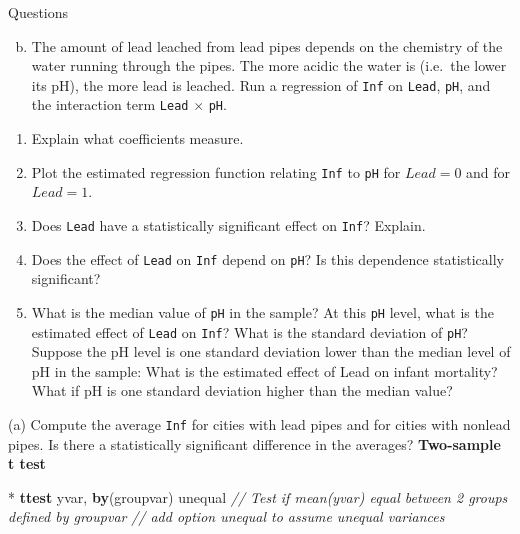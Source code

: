 \documentclass[
  10pt,
  ignorenonframetext,
]{beamer}
\newenvironment{Shaded}{\begin{snugshade}}{\end{snugshade}}
\newcommand{\CommentTok}[1]{\textcolor[rgb]{0.56,0.35,0.01}{\textit{#1}}}
\newcommand{\KeywordTok}[1]{\textcolor[rgb]{0.13,0.29,0.53}{\textbf{#1}}}
\newcommand{\NormalTok}[1]{#1}
\providecommand{\tightlist}{%
  \setlength{\itemsep}{0pt}\setlength{\parskip}{0pt}}
\begin{document}
\begin{frame}[fragile]{Questions}
\protect\hypertarget{questions-3}{}
\begin{enumerate}
[(a)]
\setcounter{enumi}{1}
\tightlist
\item
  The amount of lead leached from lead pipes depends on the chemistry of
  the water running through the pipes. The more acidic the water is
  (i.e.~the lower its pH), the more lead is leached. Run a regression of
  \texttt{Inf} on \texttt{Lead}, \texttt{pH}, and the interaction term
  \texttt{Lead} \(\times\) \texttt{pH}. \small
\end{enumerate}

\begin{enumerate}
\item
  Explain what coefficients measure.
\item
  Plot the estimated regression function relating \texttt{Inf} to
  \texttt{pH} for \(Lead = 0\) and for \(Lead = 1\).
\item
  Does \texttt{Lead} have a statistically significant effect on
  \texttt{Inf}? Explain.
\item
  Does the effect of \texttt{Lead} on \texttt{Inf} depend on
  \texttt{pH}? Is this dependence statistically significant?
\item
  What is the median value of \texttt{pH} in the sample? At this
  \texttt{pH} level, what is the estimated effect of \texttt{Lead} on
  \texttt{Inf}? What is the standard deviation of \texttt{pH}?\\
  Suppose the pH level is one standard deviation lower than the median
  level of pH in the sample: What is the estimated effect of Lead on
  infant mortality?\\
  What if pH is one standard deviation higher than the median value?
\end{enumerate}
\end{frame}

\begin{frame}[fragile]{(a) Compute the average \texttt{Inf} for cities
with lead pipes and for cities with nonlead pipes. Is there a
statistically significant difference in the averages?}
\protect\hypertarget{a-compute-the-average-inf-for-cities-with-lead-pipes-and-for-cities-with-nonlead-pipes.-is-there-a-statistically-significant-difference-in-the-averages}{}
\textbf{Two-sample t test} \footnotesize

\begin{Shaded}
\begin{Highlighting}[]
\NormalTok{* }\KeywordTok{ttest}\NormalTok{ yvar, }\KeywordTok{by}\NormalTok{(groupvar) unequal}
\CommentTok{// Test if mean(yvar) equal between 2 groups defined by groupvar}
\CommentTok{// add option \textquotesingle{}unequal\textquotesingle{} to assume unequal variances}
\end{Highlighting}
\end{Shaded}
\end{frame}
\end{document}
